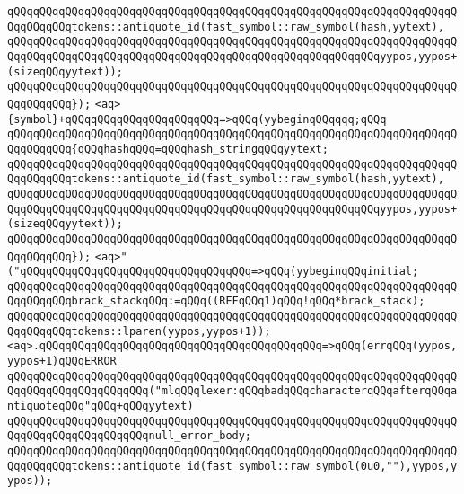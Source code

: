 \newline
\verb|qQQqqQQqqQQqqQQqqQQqqQQqqQQqqQQqqQQqqQQqqQQqqQQqqQQqqQQqqQQqqQQqqQQqqQQqqQQqqQQqtokens::antiquote_id(fast_symbol::raw_symbol(hash,yytext),|\newline
\verb|qQQqqQQqqQQqqQQqqQQqqQQqqQQqqQQqqQQqqQQqqQQqqQQqqQQqqQQqqQQqqQQqqQQqqQQqqQQqqQQqqQQqqQQqqQQqqQQqqQQqqQQqqQQqqQQqqQQqqQQqqQQqqQQqyypos,yypos+(sizeqQQqyytext));|\newline
\verb|qQQqqQQqqQQqqQQqqQQqqQQqqQQqqQQqqQQqqQQqqQQqqQQqqQQqqQQqqQQqqQQqqQQqqQQqqQQqqQQq});|\newline
\verb|<aq>{symbol}+qQQqqQQqqQQqqQQqqQQqqQQq=>qQQq(yybeginqQQqqqq;qQQq|\newline
\verb|qQQqqQQqqQQqqQQqqQQqqQQqqQQqqQQqqQQqqQQqqQQqqQQqqQQqqQQqqQQqqQQqqQQqqQQqqQQqqQQq{qQQqhashqQQq=qQQqhash_stringqQQqyytext;|\newline
\newline
\verb|qQQqqQQqqQQqqQQqqQQqqQQqqQQqqQQqqQQqqQQqqQQqqQQqqQQqqQQqqQQqqQQqqQQqqQQqqQQqqQQqtokens::antiquote_id(fast_symbol::raw_symbol(hash,yytext),|\newline
\verb|qQQqqQQqqQQqqQQqqQQqqQQqqQQqqQQqqQQqqQQqqQQqqQQqqQQqqQQqqQQqqQQqqQQqqQQqqQQqqQQqqQQqqQQqqQQqqQQqqQQqqQQqqQQqqQQqqQQqqQQqqQQqqQQqyypos,yypos+(sizeqQQqyytext));|\newline
\verb|qQQqqQQqqQQqqQQqqQQqqQQqqQQqqQQqqQQqqQQqqQQqqQQqqQQqqQQqqQQqqQQqqQQqqQQqqQQqqQQq});|\newline
\verb|<aq>"("qQQqqQQqqQQqqQQqqQQqqQQqqQQqqQQqqQQq=>qQQq(yybeginqQQqinitial;|\newline
\verb|qQQqqQQqqQQqqQQqqQQqqQQqqQQqqQQqqQQqqQQqqQQqqQQqqQQqqQQqqQQqqQQqqQQqqQQqqQQqqQQqbrack_stackqQQq:=qQQq((REFqQQq1)qQQq!qQQq*brack_stack);|\newline
\verb|qQQqqQQqqQQqqQQqqQQqqQQqqQQqqQQqqQQqqQQqqQQqqQQqqQQqqQQqqQQqqQQqqQQqqQQqqQQqqQQqtokens::lparen(yypos,yypos+1));|\newline
\verb|<aq>.qQQqqQQqqQQqqQQqqQQqqQQqqQQqqQQqqQQqqQQqqQQq=>qQQq(errqQQq(yypos,yypos+1)qQQqERROR|\newline
\verb|qQQqqQQqqQQqqQQqqQQqqQQqqQQqqQQqqQQqqQQqqQQqqQQqqQQqqQQqqQQqqQQqqQQqqQQqqQQqqQQqqQQqqQQqqQQq("mlqQQqlexer:qQQqbadqQQqcharacterqQQqafterqQQqantiquoteqQQq"qQQq+qQQqyytext)|\newline
\verb|qQQqqQQqqQQqqQQqqQQqqQQqqQQqqQQqqQQqqQQqqQQqqQQqqQQqqQQqqQQqqQQqqQQqqQQqqQQqqQQqqQQqqQQqqQQqnull_error_body;|\newline
\verb|qQQqqQQqqQQqqQQqqQQqqQQqqQQqqQQqqQQqqQQqqQQqqQQqqQQqqQQqqQQqqQQqqQQqqQQqqQQqqQQqtokens::antiquote_id(fast_symbol::raw_symbol(0u0,""),yypos,yypos));|\newline

